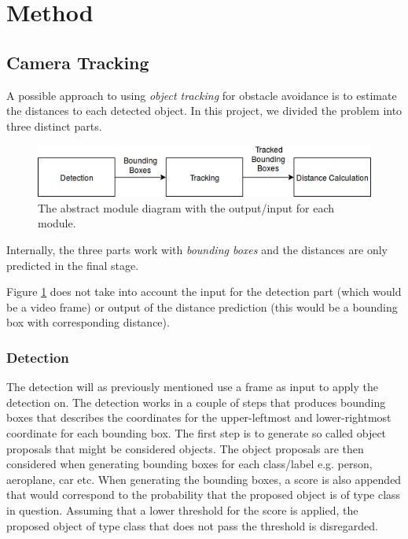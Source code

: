 \documentclass[a4paper]{article}
\begin{document}
\section{Method}

\subsection{Camera Tracking}

A possible approach to using \emph{object tracking} for obstacle avoidance is to estimate the distances to each detected object. In this project, we divided the problem into three distinct parts.
\begin{figure}[H]
  \begin{center}
    \includegraphics[width=1\textwidth]{figures/Moudule_diagram}
  \end{center}
  \caption{The abstract module diagram with the output/input for each module. }
  \label{fig:Mod_dia}
\end{figure}
Internally, the three parts work with \emph{bounding boxes} and the distances are only predicted in the final stage.

Figure \ref{fig:Mod_dia} does not take into account the input for the detection part (which would be a video frame) or output of the distance prediction (this would be a bounding box with corresponding distance).

\subsubsection{Detection}

The detection will as previously mentioned use a frame as input to apply the detection on.
The detection works in a couple of steps that produces bounding boxes that describes the coordinates for the upper-leftmost and lower-rightmost coordinate for each bounding box.
The first step is to generate so called object proposals that might be considered objects.
The object proposals are then considered when generating bounding boxes for each class/label e.g. person, aeroplane, car etc.
When generating the bounding boxes, a score is also appended that would correspond to the probability that the proposed object is of type class in question.
Assuming that a lower threshold for the score is applied, the proposed object of type class that does not pass the threshold is disregarded.
\end{document}
